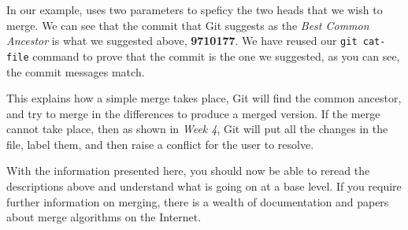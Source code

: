 
In our example,  uses two parameters to speficy the two heads that we wish to merge.  We can see that the commit that Git suggests as the \emph{Best Common Ancestor} is what we suggested above, \textbf{9710177}.  We have reused our \texttt{git cat-file} command to prove that the commit is the one we suggested, as you can see, the commit messages match.

This explains how a simple merge takes place, Git will find the common ancestor, and try to merge in the differences to produce a merged version.  If the merge cannot take place, then as shown in \emph{Week 4}, Git will put all the changes in the file, label them, and then raise a conflict for the user to resolve.  

With the information presented here, you should now be able to reread the descriptions above and understand what is going on at a base level.  If you require further information on merging, there is a wealth of documentation and papers about merge algorithms on the Internet.

